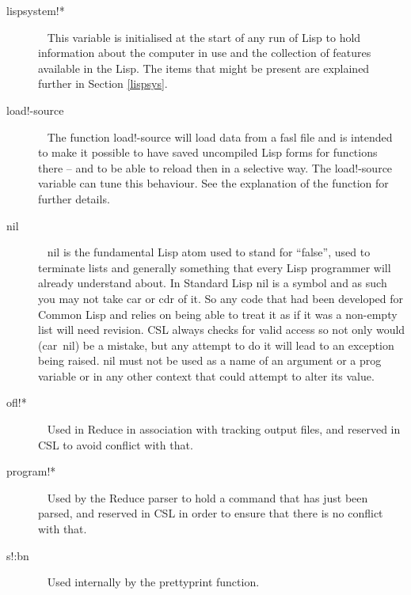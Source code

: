 \documentclass[a4paper,11pt]{article}
\begin{document}
\begin{description}
\item [{\ttfamily lispsystem!*}]  ~\newline
This variable is initialised at the start of any run of Lisp to hold
information about the computer in use and the collection of features
available in the Lisp. The items that might be present are explained
further in Section \ref{lispsys}.

\item [{\ttfamily load!-source}]  ~\newline
The function {\ttfamily load!-source} will load data from a fasl file
and is intended to make it possible to have saved uncompiled Lisp forms
for functions there -- and to be able to reload then in a selective
way. The {\ttfamily load!-source} variable can tune this behaviour. See the
explanation of the function for further details.

\item [{\ttfamily nil}]  ~\newline
{\ttfamily nil} is the fundamental Lisp atom used to stand for ``false'',
used to terminate lists and generally something that every Lisp programmer
will already understand about. In Standard Lisp {\ttfamily nil} is a
symbol and as such you may not take {\ttfamily car} or {\ttfamily cdr} of
it. So any code that had been developed for Common Lisp and relies on being
able to treat it as if it was a non-empty list will need revision. CSL
always checks for valid access so not only would {\ttfamily (car~nil)} be
a mistake,  but any attempt to do it will lead to an exception being
raised. {\ttfamily nil} must not be used as a name of an argument or a
{\ttfamily prog} variable or in any other context that could attempt to
alter its value.

\item [{\ttfamily ofl!*}]  ~\newline
Used in Reduce in association with tracking output files, and reserved in
CSL to avoid conflict with that.

\item [{\ttfamily program!*}]  ~\newline
Used by the Reduce parser to hold a command that has just been parsed, and
reserved in CSL in order to ensure that there is no conflict with that.

\item [{\ttfamily s!:bn}]  ~\newline
Used internally by the prettyprint function.


\end{description}
\end{document}
